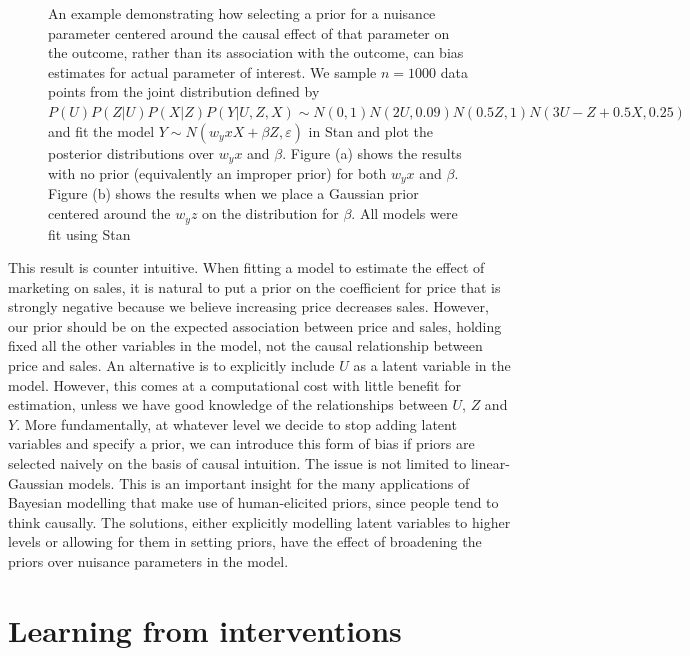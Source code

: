 \documentclass[11pt,a4paper,twoside]{report}
\theoremstyle{plain}
\theoremstyle{definition}
\let\epsilon\varepsilon
\begin{document}
\begin{figure}[ht]
\begin{subfigure}[t]{0.99\textwidth}
\end{subfigure}
\caption{An example demonstrating how selecting a prior for a nuisance parameter centered around the causal effect of that parameter on the outcome, rather than its association with the outcome, can bias estimates for actual parameter of interest. We sample $n=1000$ data points from the joint distribution defined by $P(U)P(Z|U)P(X|Z)P(Y|U,Z,X) \sim N(0,1)N(2U,0.09)N(0.5Z,1)N(3U -Z + 0.5X , 0.25)$ and fit the model $Y \sim N(w_yx X+\beta Z,\epsilon)$ in Stan and plot the posterior distributions over $w_yx$ and $\beta$. Figure (a) shows the results with no prior (equivalently an improper prior) for both $w_yx$ and $\beta$. Figure (b) shows the results when we place a Gaussian prior centered around the $w_yz$ on the distribution for $\beta$. All models were fit using Stan \citep{carpenter2016stan}}\label{fig:careful-prior-example}
\end{figure}

This result is counter intuitive. When fitting a model to estimate the effect of marketing on sales, it is natural to put a prior on the coefficient for price that is strongly negative because we believe increasing price decreases sales. However, our prior should be on the expected association between price and sales, holding fixed all the other variables in the model, not the causal relationship between price and sales. An alternative is to explicitly include $U$ as a latent variable in the model. However, this comes at a computational cost with little benefit for estimation, unless we have good knowledge of the relationships between $U$, $Z$ and $Y$. More fundamentally, at whatever level we decide to stop adding latent variables and specify a prior, we can introduce this form of bias if priors are selected naively on the basis of causal intuition. The issue is not limited to linear-Gaussian models. This is an important insight for the many applications of Bayesian modelling that make use of human-elicited priors, since people tend to think causally. The solutions, either explicitly modelling latent variables to higher levels or allowing for them in setting priors, have the effect of broadening the priors over nuisance parameters in the model. 


\chapter{Learning from interventions}
\label{chap:interventionalist_view}
\end{document}
